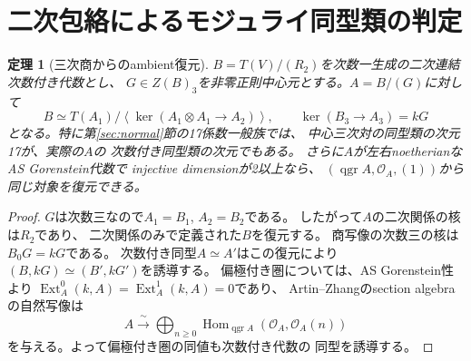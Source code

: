 \documentclass[11pt,a4paper]{ltjsarticle}
\numberwithin{equation}{section}
\newtheorem{theorem}{定理}[section]
\newcommand{\OO}{\mathcal O}
\newcommand{\qgr}{\operatorname{qgr}}
\begin{document}









\section{二次包絡によるモジュライ同型類の判定}\label{sec:moduli-iso}
\begin{theorem}[三次商からのambient復元]\label{thm:moduli-iso}
$B=T(V)/(R_2)$を次数一生成の二次連結次数付き代数とし、
$G\in Z(B)_3$を非零正則中心元とする。$A=B/(G)$に対して
\begin{equation}\label{eq:moduli-envelope}
 B\simeq T(A_1)/
 \left\langle\ker(A_1\otimes A_1\longrightarrow A_2)\right\rangle,
 \qquad \ker(B_3\longrightarrow A_3)=kG
\end{equation}
となる。特に第\ref{sec:normal}節の17係数一般族では、
中心三次対の同型類の次元17が、実際の$A$の
次数付き同型類の次元でもある。
さらに$A$が左右noetherianなAS Gorenstein代数で
injective dimensionが2以上なら、
$(\qgr A,\OO_A,(1))$から同じ対象を復元できる。
\end{theorem}
\begin{proof}
$G$は次数三なので$A_1=B_1$, $A_2=B_2$である。
したがって$A$の二次関係の核は$R_2$であり、
二次関係のみで定義された$B$を復元する。
商写像の次数三の核は$B_0G=kG$である。
次数付き同型$A\simeq A'$はこの復元により
$(B,kG)\simeq(B',kG')$を誘導する。
偏極付き圏については、AS Gorenstein性より
$\operatorname{Ext}_A^0(k,A)=\operatorname{Ext}_A^1(k,A)=0$であり、
Artin--Zhangのsection algebraの自然写像は
\begin{equation}\label{eq:moduli-section}
 A\xrightarrow{\ \sim\ }\bigoplus_{n\ge0}
 \operatorname{Hom}_{\qgr A}(\OO_A,\OO_A(n))
\end{equation}
を与える。よって偏極付き圏の同値も次数付き代数の
同型を誘導する。
\end{proof}
















\end{document}
